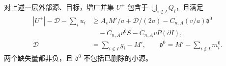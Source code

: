 \begin{lemma}[角部补偿与校正后的单层体积]\label{lem:global-augmented-capacity}
对上述一层外部源、目标，增广并集 \(U^+\) 包含于
\(\bigcup_{i\notin I}Q_i\)，且满足
\begin{equation}\label{eq:global-capacity-settlement}
 \begin{aligned}
 |U^+|-\mathcal D-\sum_i u_i
 &\ge A_vM'/a+\mathcal D/(2a)
       -C_{n,A}(v/a)\mathfrak d^0\\
 &\quad-C_{n,A}v^6S-C_{n,A}vP(\partial I),\\
 \mathcal D&=\sum_{i\notin I}g_i-M',\qquad
 \mathfrak d^0=M'-\sum_{i\notin I}m_i^0.
 \end{aligned}
\end{equation}
两个缺失量都非负，且 \(\mathfrak d^0\) 不包括已删除的小源。
\end{lemma}
